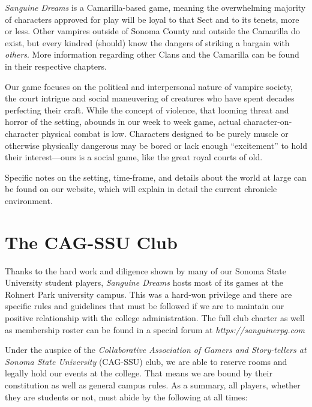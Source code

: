 \emph{Sanguine Dreams} is a Camarilla-based game, meaning the overwhelming majority of 
characters approved for play will be loyal to that Sect and to its tenets, more or less.  
Other vampires outside of Sonoma County and outside the Camarilla do exist, but every 
kindred (should) know the dangers of striking a bargain with \emph{others}.  More 
information regarding other Clans and the Camarilla can be found in their respective 
chapters.

Our game focuses on the political and interpersonal nature of vampire society, the court 
intrigue and social maneuvering of creatures who have spent decades perfecting their craft.  
While the concept of violence, that looming threat and horror of the setting, abounds in our 
week to week game, actual character-on-character physical combat is low.  Characters designed 
to be purely muscle or otherwise physically dangerous may be bored or lack enough ``excitement'' 
to hold their interest---ours is a social game, like the great royal courts of old.

Specific notes on the setting, time-frame, and details about the world at large can be found on our 
website, which will explain in detail the current chronicle environment.

\section{The CAG-SSU Club}
Thanks to the hard work and diligence shown by many of our Sonoma State University student players, 
\emph{Sanguine Dreams} hosts most of its games at the Rohnert Park university campus.  This was a 
hard-won privilege and there are specific rules and guidelines that must be followed if we are to 
maintain our positive relationship with the college administration.  The full club charter as well 
as membership roster can be found in a special forum at \emph{https://sanguinerpg.com}

Under the auspice of the \emph{Collaborative Association of Gamers and Story-tellers at Sonoma State 
University} (CAG-SSU) club, we are able to reserve rooms and legally hold our events at the college.  
That means we are bound by their constitution as well as general campus rules.  As a summary, all 
players, whether they are students or not, must abide by the following at all times:

